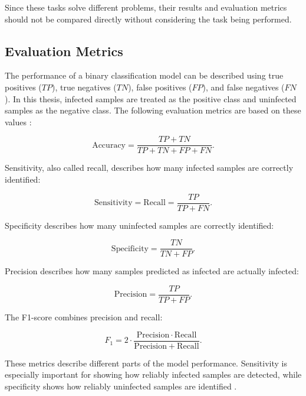 Since these tasks solve different problems, their results and evaluation metrics should not be compared directly without considering the task being performed.

\subsection{Evaluation Metrics}

The performance of a binary classification model can be described using true positives ($TP$), true negatives ($TN$), false positives ($FP$), and false negatives ($FN$). In this thesis, infected samples are treated as the positive class and uninfected samples as the negative class. The following evaluation metrics are based on these values \cite{Delahunt2024}:

\begin{equation}
\mathrm{Accuracy} =
\frac{TP+TN}
{TP+TN+FP+FN}.
\label{eq:accuracy}
\end{equation}

Sensitivity, also called recall, describes how many infected samples are correctly identified:

\begin{equation}
\mathrm{Sensitivity} =
\mathrm{Recall} =
\frac{TP}
{TP+FN}.
\label{eq:sensitivity}
\end{equation}

Specificity describes how many uninfected samples are correctly identified:

\begin{equation}
\mathrm{Specificity} =
\frac{TN}
{TN+FP}.
\label{eq:specificity}
\end{equation}

Precision describes how many samples predicted as infected are actually infected:

\begin{equation}
\mathrm{Precision} =
\frac{TP}
{TP+FP}.
\label{eq:precision}
\end{equation}

The F1-score combines precision and recall:

\begin{equation}
F_1 =
2 \cdot
\frac{\mathrm{Precision}\cdot\mathrm{Recall}}
{\mathrm{Precision}+\mathrm{Recall}}.
\label{eq:f1_score}
\end{equation}

These metrics describe different parts of the model performance. Sensitivity is especially important for showing how reliably infected samples are detected, while specificity shows how reliably uninfected samples are identified \cite{Delahunt2024}.

